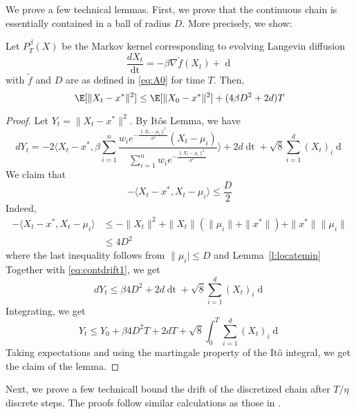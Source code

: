 We prove a few technical lemmas. First, we prove that the continuous chain is essentially contained in a ball of radius $D$. More precisely, we show: 


\begin{lem} Let $P^{\beta}_T(X)$ be the Markov kernel corresponding to evolving Langevin diffusion 
\begin{equation*}\frac{dX_t}{\mathop{dt}} = - \beta \nabla \tilde{f}(X_t) + \mathop{d B_t}\end{equation*} 
with $\tilde{f}$ and $D$ are as defined in \ref{eq:A0} for time $T$. Then, 
\begin{equation*}\E[\|X_t - x^*\|^2] \leq \E[\|X_0 - x^*\|^2] + (4 \beta D^2 + 2 d)T \end{equation*} 
\label{l:reachcontinuous}
\end{lem} 
\begin{proof} 
Let $Y_t = \|X_t - x^*\|^2$. By It\^{o}s Lemma, we have 
\begin{equation} d Y_t = -2 \langle X_t - x^*, \beta \sum_{i=1}^n \frac{w_i e^{-\frac{\|X_t - \mu_i\|^2}{\sigma^2}} (X_t - \mu_i)}{\sum_{i=1}^n w_i e^{-\frac{\|X_t - \mu_i\|^2}{\sigma^2}}}  \rangle + 2 d \mathop{dt} + \sqrt{8} \sum_{i=1}^d (X_t)_i \mathop{d(B_i)_t} \label{eq:contdrift1} \end{equation} 
We claim that 
$$- \langle X_t - x^*, X_t - \mu_i \rangle \leq \frac{D}{2}$$
Indeed, 
\begin{align*} 
- \langle X_t - x^*, X_t - \mu_i \rangle &\leq -\|X_t\|^2 + \|X_t\| (\|\mu_i\| + \|x^*\|) + \|x^*\| \|\mu_i\| \\ 
&\leq 4 D^2  
\end{align*} 
where the last inequality follows from $\|\mu_i|\leq D$ and Lemma~\ref{l:locatemin}
Together with \eqref{eq:contdrift1}, we get 
\begin{equation*} d Y_t \leq  \beta 4 D^2 + 2 d \mathop{dt} + \sqrt{8} \sum_{i=1}^d (X_t)_i \mathop{d(B_i)_t}  \end{equation*} 
Integrating, we get 
\begin{equation*} Y_t \leq  Y_0 + \beta 4 D^2  T + 2 d T + \sqrt{8} \int^T_0 \sum_{i=1}^d (X_t)_i \mathop{d(B_i)_t}  \end{equation*} 
Taking expectations and using the martingale property of the It\^{o}  integral, we get the claim of the lemma. 
\end{proof} 

Next, we prove a few technicall bound the drift of the discretized chain after $T/\eta$ discrete steps. The proofs follow similar calculations as those in \cite{dalalyan2016theoretical}.   

